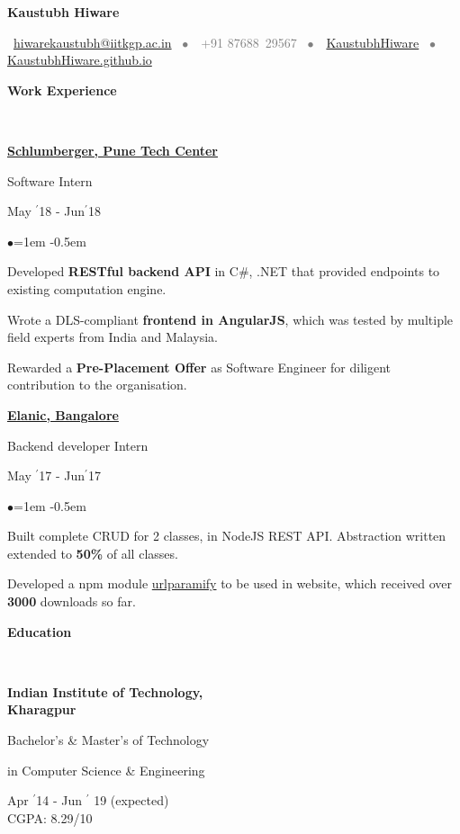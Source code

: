 \documentclass[11pt, a4paper]{resume}
\newcommand{\important}[1]{
  \textcolor{mypurple}{#1}
}
\newcommand{\greyed}[1]{
  \textcolor{gray}{#1}
}
\newcommand{\titleX}[1]{
  \begin{LARGE}
      \important{\centerline{\textbf{#1}}}
    \end{LARGE}
}
\newcommand{\fillit}[1]{
  \leavevmode\xleaders\hbox{#1}\hfill\kern0pt
}
\newcommand{\sectionTitle}[1]{
  \begin{Large}
      \important{\textbf{#1}} 
    \end{Large}
    \important{\rlap{\rule[.5ex]{\linegoal}{0.5pt}}{}}
     \vspace{0.1em}\\
}
\newcommand{\textbox}[1]{
  \parbox{.333\textwidth}{#1}
}
\newenvironment{Jobsection}[3]{ %
\noindent\textbox{\bf #1\hfill}\textbox{\hfil #2\hfil}\textbox{\hfill #3}
  \begin{list}{$\bullet$}{\leftmargin=1em} %
   \itemsep -0.5em \vspace{-0.5em} %
  }{
  \end{list}
  \vspace{0.2em} %
}
\newcommand{\education}[3]{ %
\noindent\parbox{.3\textwidth}{\bf #1\hfill}\parbox{.45\textwidth}{\hfil #2\hfil}\parbox{.25\textwidth}{\hfill #3}
}
\begin{document}
\titleX{Kaustubh Hiware}
\normalsize
\vspace{6pt}
\greyed{\centerline{\faEnvelopeO \, \href{mailto:hiwarekaustubh@iitkgp.ac.in}{ hiwarekaustubh@iitkgp.ac.in} \, $\bullet$ \,\faMobile\, +91 87688\, 29567 \, $\bullet$ \,\faGithub \, \href{https://github.com/kaustubhhiware}{KaustubhHiware} \,  $\bullet$ \, \faGlobe \, \href{https://kaustubhhiware.github.io}{KaustubhHiware.github.io}}}

\vspace{-2em}
\sectionTitle{Work Experience}
\begin{Jobsection}{\href{https://drive.google.com/file/d/1EcfIC_g8bx3whaxMdOkFyZx4TCqA1RAq/view?usp=sharing}{Schlumberger, Pune Tech Center}}{Software Intern}{ May $^{\prime}$18 - Jun$^{\prime}$18}
\item Developed {\bf RESTful backend API} in C\#, .NET that provided endpoints to existing computation engine.
\item Wrote a DLS-compliant {\bf frontend in AngularJS}, which was tested  by multiple field experts from India and Malaysia.
\item Rewarded a {\bf Pre-Placement Offer} as Software Engineer for diligent contribution to the organisation.
\end{Jobsection}

\begin{Jobsection}{\href{https://drive.google.com/file/d/0B5iU6cWw36rOVWZIcllPY3RSd2c/view?usp=sharing}{Elanic, Bangalore}}{Backend developer Intern}{ May $^{\prime}$17 - Jun$^{\prime}$17}
\item Built complete CRUD for 2 classes, in NodeJS REST API. Abstraction written extended to {\bf 50\%} of all classes.
\item Developed a npm module \href{https://www.npmjs.com/package/urlparamify}{urlparamify} to be used in website, which received over {\bf 3000} downloads so far.
\end{Jobsection}

\sectionTitle{Education\vspace{0.5em}}
\education{Indian Institute of Technology,\\ Kharagpur}{\centerline{Bachelor's \& Master's of Technology} \centerline{in Computer Science \& Engineering}}{Apr $^{\prime}$14 - Jun $^{\prime}$ 19 (expected) \\\hspace*{\fill} CGPA: 8.29/10}
\end{document}
